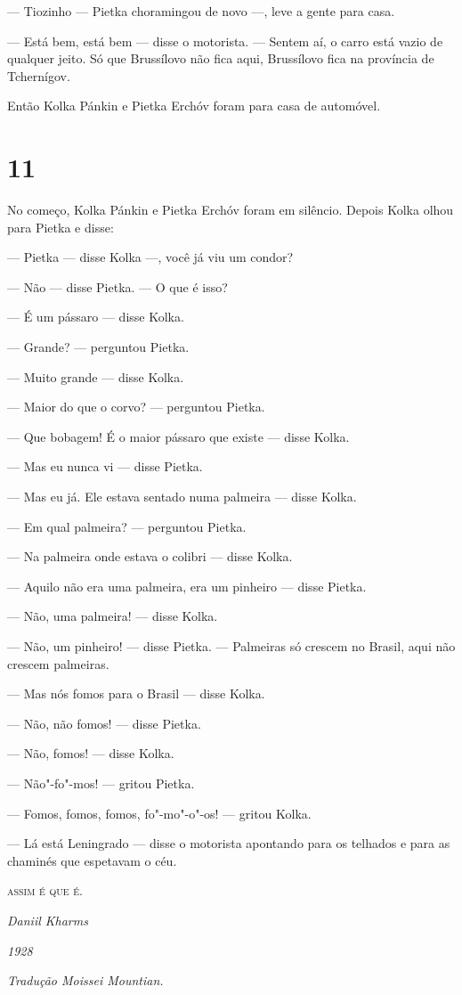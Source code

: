 --- Tiozinho --- Pietka choramingou de novo ---, leve a gente para casa.

--- Está bem, está bem --- disse o motorista. --- Sentem aí, o carro
está vazio de qualquer jeito. Só que Brussílovo não fica aqui,
Brussílovo fica na província de Tchernígov.

Então Kolka Pánkin e Pietka Erchóv foram para casa de automóvel.

\section{11}

No começo, Kolka Pánkin e Pietka Erchóv foram em silêncio. Depois Kolka
olhou para Pietka e disse:

--- Pietka --- disse Kolka ---, você já viu um condor?

--- Não --- disse Pietka. --- O que é isso?

--- É um pássaro --- disse Kolka.

--- Grande? --- perguntou Pietka.

--- Muito grande --- disse Kolka.

--- Maior do que o corvo? --- perguntou Pietka.

--- Que bobagem! É o maior pássaro que existe --- disse Kolka.

--- Mas eu nunca vi --- disse Pietka.

--- Mas eu já. Ele estava sentado numa palmeira --- disse Kolka.

--- Em qual palmeira? --- perguntou Pietka.

--- Na palmeira onde estava o colibri --- disse Kolka.

--- Aquilo não era uma palmeira, era um pinheiro --- disse Pietka.

--- Não, uma palmeira! --- disse Kolka.

--- Não, um pinheiro! --- disse Pietka. --- Palmeiras só crescem no
Brasil, aqui não crescem palmeiras.

--- Mas nós fomos para o Brasil --- disse Kolka.

--- Não, não fomos! --- disse Pietka.

--- Não, fomos! --- disse Kolka.

--- Não"-fo"-mos! --- gritou Pietka.

--- Fomos, fomos, fomos, fo"-mo"-o"-os! --- gritou Kolka.

--- Lá está Leningrado --- disse o motorista apontando para os telhados
e para as chaminés que espetavam o céu.

\bigskip

\begin{center}
\textsc{assim é que é.}
\end{center}

\hfill\emph{Daniil Kharms}

\hfill\emph{1928}

\medskip

{\footnotesize\hfill\emph{Tradução Moissei Mountian.}}

